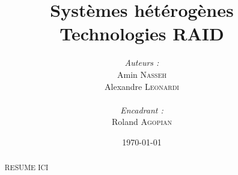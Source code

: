 \documentclass[a4paper,11pt]{article}
\title{
  \textbf{Systèmes hétérogènes}\\
  Technologies RAID
}
\author{
\begin{minipage}{0.4\textwidth}
	\begin{flushleft} \large
		\emph{Auteurs :}\\
                Amin \textsc{Nasseh}\\
		Alexandre \textsc{Leonardi}\\
	\end{flushleft}
\end{minipage}
\begin{minipage}{0.4\textwidth}
	\begin{flushright} \large
		\emph{Encadrant :} \\
		Roland \textsc{Agopian}\\
	\end{flushright}
\end{minipage}
}
\date{\today}
\begin{document}
\maketitle
\thispagestyle{empty}
\begin{abstract}
RESUME ICI
\end{abstract}
\pagebreak

\tableofcontents
\pagebreak



\pagebreak

\pagebreak

\pagebreak

\pagebreak

\pagebreak
\nocite{*}

\end{document}
